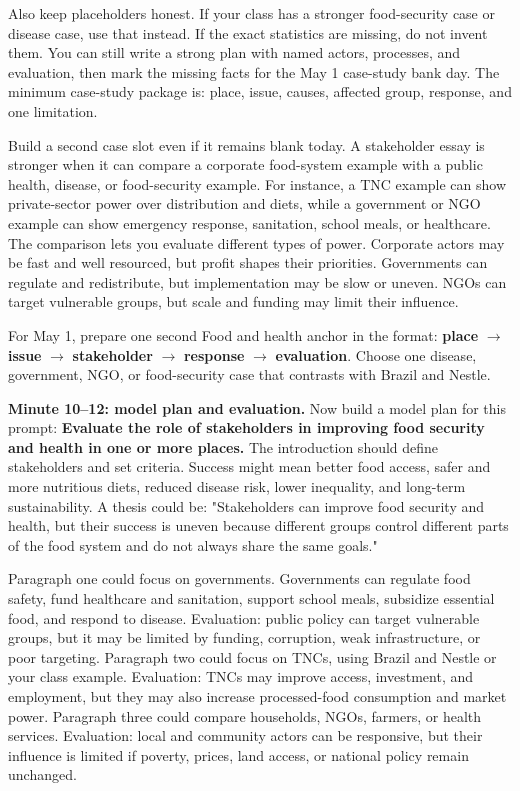 \documentclass[11pt,a4paper]{article}
\newcommand{\term}[1]{\textcolor{HeadingBlue}{\textbf{#1}}}
\newcommand{\exam}[1]{\textcolor{AccentTeal}{\textbf{#1}}}
\begin{document}
Also keep placeholders honest. If your class has a stronger food-security case
or disease case, use that instead. If the exact statistics are missing, do not
invent them. You can still write a strong plan with named actors, processes,
and evaluation, then mark the missing facts for the May 1 case-study bank day.
The minimum case-study package is: place, issue, causes, affected group,
response, and one limitation.

Build a second case slot even if it remains blank today. A stakeholder essay is
stronger when it can compare a corporate food-system example with a public
health, disease, or food-security example. For instance, a TNC example can show
private-sector power over distribution and diets, while a government or NGO
example can show emergency response, sanitation, school meals, or healthcare.
The comparison lets you evaluate different types of power. Corporate actors may
be fast and well resourced, but profit shapes their priorities. Governments can
regulate and redistribute, but implementation may be slow or uneven. NGOs can
target vulnerable groups, but scale and funding may limit their influence.

For May 1, prepare one second Food and health anchor in the format:
\term{place} $\rightarrow$ \term{issue} $\rightarrow$ \term{stakeholder}
$\rightarrow$ \term{response} $\rightarrow$ \term{evaluation}. Choose one
disease, government, NGO, or food-security case that contrasts with Brazil and
Nestle.

\textbf{Minute 10--12: model plan and evaluation.}
Now build a model plan for this prompt: \exam{Evaluate the role of stakeholders
in improving food security and health in one or more places.} The introduction
should define stakeholders and set criteria. Success might mean better food
access, safer and more nutritious diets, reduced disease risk, lower
inequality, and long-term sustainability. A thesis could be: "Stakeholders can
improve food security and health, but their success is uneven because different
groups control different parts of the food system and do not always share the
same goals."

Paragraph one could focus on governments. Governments can regulate food safety,
fund healthcare and sanitation, support school meals, subsidize essential food,
and respond to disease. Evaluation: public policy can target vulnerable groups,
but it may be limited by funding, corruption, weak infrastructure, or poor
targeting. Paragraph two could focus on TNCs, using Brazil and Nestle or your
class example. Evaluation: TNCs may improve access, investment, and employment,
but they may also increase processed-food consumption and market power.
Paragraph three could compare households, NGOs, farmers, or health services.
Evaluation: local and community actors can be responsive, but their influence
is limited if poverty, prices, land access, or national policy remain unchanged.
\end{document}
